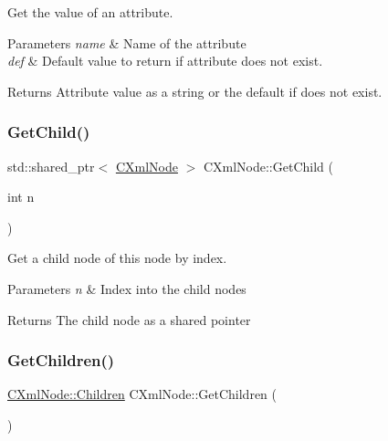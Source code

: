 Get the value of an attribute. 


\begin{DoxyParams}{Parameters}
{\em name} & Name of the attribute \\
\hline
{\em def} & Default value to return if attribute does not exist. \\
\hline
\end{DoxyParams}
\begin{DoxyReturn}{Returns}
Attribute value as a string or the default if does not exist. 
\end{DoxyReturn}
\mbox{\label{classxmlnode_1_1_c_xml_node_ac5700bda1faebcbe5bb042e043ea60be}} 
\subsubsection{\texorpdfstring{GetChild()}{GetChild()}}
{\footnotesize\ttfamily std\+::shared\+\_\+ptr$<$ \mbox{\hyperlink{classxmlnode_1_1_c_xml_node}{C\+Xml\+Node}} $>$ C\+Xml\+Node\+::\+Get\+Child (\begin{DoxyParamCaption}\item[{int}]{n }\end{DoxyParamCaption})}



Get a child node of this node by index. 


\begin{DoxyParams}{Parameters}
{\em n} & Index into the child nodes \\
\hline
\end{DoxyParams}
\begin{DoxyReturn}{Returns}
The child node as a shared pointer 
\end{DoxyReturn}
\mbox{\label{classxmlnode_1_1_c_xml_node_a03f86570ca40d4cc09c3e1841939a9d0}} 
\subsubsection{\texorpdfstring{GetChildren()}{GetChildren()}}
{\footnotesize\ttfamily \mbox{\hyperlink{classxmlnode_1_1_c_xml_node_1_1_children}{C\+Xml\+Node\+::\+Children}} C\+Xml\+Node\+::\+Get\+Children (\begin{DoxyParamCaption}{ }\end{DoxyParamCaption})}



